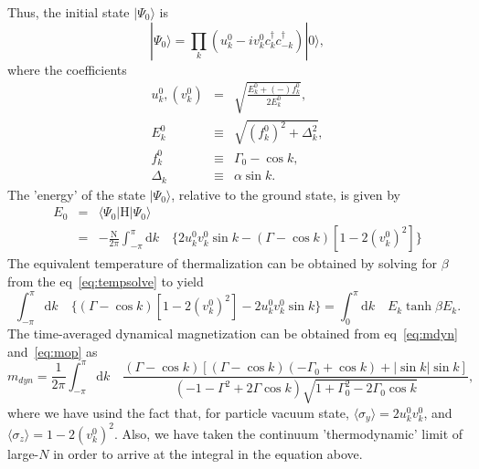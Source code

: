 \documentclass[a4paper,10pt]{article}
\begin{document}
Thus, the initial state $|\Psi_0\rangle$ is
\begin{equation}
\label{eq:psi0}
|\Psi_0\rangle=\prod_k \left(u^0_k-iv^0_kc^\dagger_{k}c^\dagger_{-k}\right)|0\rangle,
\end{equation}
where the coefficients
\begin{eqnarray}
\label{eq:ukvk}
 u^0_k,(v^0_k) &=& \sqrt{\frac{E^0_k+(-) f^0_k}{2E^0_k}},\nonumber \\
 E^0_k &\equiv& \sqrt{\left(f^0_k\right)^2+\Delta^2_k},\nonumber \\
 f^0_k &\equiv& \Gamma_0 -\cos{k},\nonumber \\
 \Delta_k &\equiv& \alpha\sin{k}.
\end{eqnarray}
The 'energy' of the state $|\Psi_0\rangle$, relative to the ground state, is given by
\begin{eqnarray}
E_0 &=& \langle\Psi_0|\mathrm{H}|\Psi_0\rangle \nonumber \\
    &=& -\frac{\mathrm{N}}{2\pi}\int^\pi_{-\pi}\mathrm{d}k\quad\bigg\{2 u^0_k v^0_k \sin{k}-(\Gamma -\cos{k}) \left[1-2 \left(v^0_k\right)^2\right]\bigg\}
\end{eqnarray}
The equivalent temperature of thermalization can be obtained by solving for $\beta$ from the eq~\ref{eq:tempsolve} to yield
\begin{equation}
\label{eq:tempsolve2}
\int^\pi_{-\pi}\mathrm{d}k\quad\bigg\{(\Gamma -\cos{k}) \left[1-2 \left(v^0_k\right)^2\right]-2 u^0_k v^0_k \sin{k}\bigg\} = \int^{\pi}_{0}\mathrm{d}k \quad E_k \tanh{\beta E_k}.
\end{equation}
The time-averaged dynamical magnetization can be obtained from eq~\ref{eq:mdyn} and~\ref{eq:mop} as
\begin{equation}
\label{eq:mdyn2}
m_{dyn}=\frac{1}{2\pi}\int^\pi_{-\pi}\mathrm{d}k\quad  \frac{\left(\Gamma -\cos{k}\right) \left[\left(\Gamma -\cos{k}\right) \left(-\Gamma_0+\cos{k}\right)+|\sin{k}| \sin{k}\right]}{\left(-1-\Gamma ^2+2 \Gamma  \cos{k}\right) \sqrt{1+\Gamma_0^2-2 \Gamma_0 \cos{k}}},
\end{equation}
where we have usind the fact that, for particle vacuum state, $\langle\sigma_y\rangle=2u^0_kv^0_k$, and $\langle\sigma_z\rangle=1-2(v^0_k)^2$. Also, we have taken the continuum 'thermodynamic' limit of large-$N$ in order to arrive at the integral in the equation above.
\end{document}
